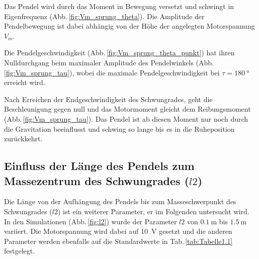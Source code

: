 Das Pendel wird durch das Moment in Bewegung versetzt und schwingt in Eigenfrequenz (Abb.\,\ref{fig:Vm_sprung_theta}). 
Die Amplitude der Pendelbewegung ist dabei abhängig von der Höhe der angelegten Motorspannung $V_m$.

Die Pendelgeschwindigkeit (Abb.\,\ref{fig:Vm_sprung_theta_punkt}) hat ihren Nulldurchgang beim maximaler Amplitude des Pendelwinkels (Abb.\,\ref{fig:Vm_sprung_tau}), wobei die maximale Pendelgeschwindigkeit bei $\tau=\SI{180}{\degree}$ erreicht wird.

Nach Erreichen der Endgeschwindigkeit des Schwungrades, geht die Beschleunigung gegen null und das Motormoment gleicht dem Reibungsmoment (Abb.\,\ref{fig:Vm_sprung_tau}).
Das Pendel ist ab diesen Moment nur noch durch die Gravitation beeinflusst und schwing so lange bis es in die Ruheposition zurückkehrt.

\subsection*{Einfluss der Länge des Pendels zum Massezentrum des Schwungrades ($l2$)}
Die Länge von der Aufhängung des Pendels bis zum Masseschwerpunkt des Schwungrades ($l2$) ist ein weiterer Parameter, er im Folgenden untersucht wird.
In den Simulationen (Abb.\,\ref{fig:l2}) wurde der Parameter $l2$ von $\SI{0.1}{\m}$ bis $\SI{1.5}{\m}$ variiert.
Die Motorspannung wird dabei auf \SI{10}{\volt} gesetzt und die anderen Parameter werden ebenfalls auf die Standardwerte in Tab.\,\ref{tab:Tabelle1.1} festgelegt.
\pagebreak

